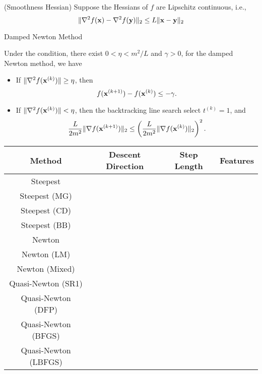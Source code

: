  (Smoothness Hessian) Suppose the Hessians of \(f\) are Lipschitz continuous, i.e.,
\begin{equation}
	\|\nabla^{2}f(\mathbf{x})-\nabla^{2}f(\mathbf{y})\|_{2}\leq L\|\mathbf{x}-\mathbf{y}\|_{2}
	\label{eq:smoothness-hessian}
\end{equation}

\begin{algorithm}[htbp]
	\caption{Damped Newton Method}
	\KwOut{}
\end{algorithm}

\begin{theorem}
	Under the condition, there exist \(0<\eta<m^{2}/L\) and \(\gamma>0\), for the damped Newton method, we have
	\begin{itemize}
		\item If \(\|\nabla^{2}f(\mathbf{x}^{(k)})\|\geq\eta\), then
		      \begin{equation*}
			      f(\mathbf{x}^{(k+1)})-f(\mathbf{x}^{(k)})\leq-\gamma.
		      \end{equation*}
		\item If \(\|\nabla^{2}f(\mathbf{x}^{(k)})\|<\eta\), then the backtracking line search select \(t^{(k)}=1\), and
		      \begin{equation*}
			      \frac{L}{2m^{2}}\|\nabla f(\mathbf{x}^{(k+1)})\|_{2}\leq \left(\frac{L}{2m^{2}}\|\nabla f(\mathbf{x}^{(k)})\|_{2}\right)^{2}.
		      \end{equation*}
	\end{itemize}
\end{theorem}

\begin{table}[htbp]
	\centering
	\begin{tabular}{cccc}
		\toprule
		Method & Descent Direction & Step Length & Features \\
		\midrule
		Steepest                                            \\
		Steepest (MG)                                       \\
		Steepest (CD)                                       \\
		Steepest (BB)                                       \\
		\midrule
		Newton                                              \\
		Newton (LM)                                         \\
		Newton (Mixed)                                      \\
		\midrule
		Quasi-Newton (SR1)                                  \\
		Quasi-Newton (DFP)                                  \\
		Quasi-Newton (BFGS)                                 \\
		Quasi-Newton (LBFGS)                                \\
		\bottomrule
	\end{tabular}
\end{table}

